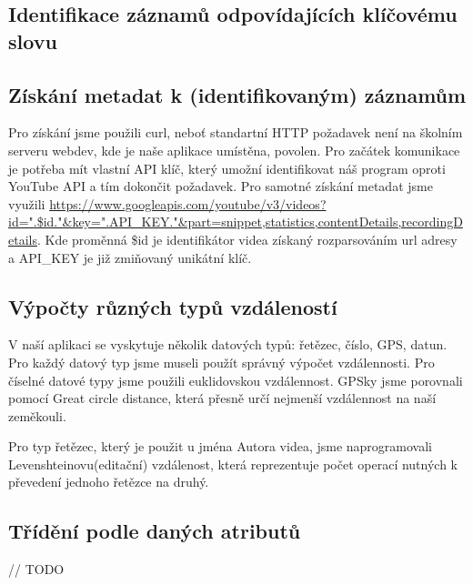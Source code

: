 \documentclass[a4paper,11pt]{article}
\begin{document}
\subsection{Identifikace záznamů odpovídajících klíčovému slovu}

\subsection{Získání metadat k (identifikovaným) záznamům}
\par Pro získání jsme použili curl, neboť standartní HTTP požadavek není na školním serveru webdev, kde je naše aplikace umístěna, povolen. Pro začátek komunikace je potřeba mít vlastní API klíč, který umožní identifikovat náš program oproti YouTube API a tím dokončit požadavek. Pro samotné získání metadat jsme využili \url{https://www.googleapis.com/youtube/v3/videos?id=".$id."&key=".API_KEY."&part=snippet,statistics,contentDetails,recordingDetails}. Kde proměnná \$id je identifikátor videa získaný rozparsováním url adresy a API\_KEY je již zmiňovaný unikátní klíč.

\subsection{Výpočty různých typů vzdáleností}
\par V naší aplikaci se vyskytuje několik datových typů: řetězec, číslo, GPS, datun. Pro každý datový typ jsme museli použít správný výpočet vzdálennosti. Pro číselné datové typy jsme použili euklidovskou vzdálennost. GPSky jsme porovnali pomocí Great circle distance, která přesně určí nejmenší vzdálennost na naší zeměkouli.
\par Pro typ řetězec, který je použit u jména Autora videa, jsme naprogramovali Levenshteinovu(editační) vzdálenost, která reprezentuje počet operací nutných k převedení jednoho řetězce na druhý.

\subsection{Třídění podle daných atributů}
\par // TODO
\end{document}
